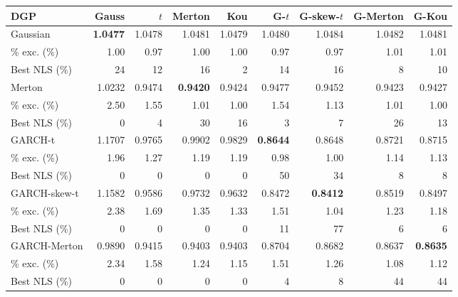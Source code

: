 \begin{tabular}{lrrrrrrrr}
\toprule
DGP & Gauss & $t$ & Merton & Kou & G-$t$ & G-skew-$t$ & G-Merton & G-Kou \\
\midrule
Gaussian & \textbf{1.0477} & 1.0478 & 1.0481 & 1.0479 & 1.0480 & 1.0484 & 1.0482 & 1.0481 \\
\quad 99\% exc. (\%) & 1.00 & 0.97 & 1.00 & 1.00 & 0.97 & 0.97 & 1.01 & 1.01 \\
\quad Best NLS (\%) & 24 & 12 & 16 & 2 & 14 & 16 & 8 & 10 \\
\midrule
Merton & 1.0232 & 0.9474 & \textbf{0.9420} & 0.9424 & 0.9477 & 0.9452 & 0.9423 & 0.9427 \\
\quad 99\% exc. (\%) & 2.50 & 1.55 & 1.01 & 1.00 & 1.54 & 1.13 & 1.01 & 1.00 \\
\quad Best NLS (\%) & 0 & 4 & 30 & 16 & 3 & 7 & 26 & 13 \\
\midrule
GARCH-t & 1.1707 & 0.9765 & 0.9902 & 0.9829 & \textbf{0.8644} & 0.8648 & 0.8721 & 0.8715 \\
\quad 99\% exc. (\%) & 1.96 & 1.27 & 1.19 & 1.19 & 0.98 & 1.00 & 1.14 & 1.13 \\
\quad Best NLS (\%) & 0 & 0 & 0 & 0 & 50 & 34 & 8 & 8 \\
\midrule
GARCH-skew-t & 1.1582 & 0.9586 & 0.9732 & 0.9632 & 0.8472 & \textbf{0.8412} & 0.8519 & 0.8497 \\
\quad 99\% exc. (\%) & 2.38 & 1.69 & 1.35 & 1.33 & 1.51 & 1.04 & 1.23 & 1.18 \\
\quad Best NLS (\%) & 0 & 0 & 0 & 0 & 11 & 77 & 6 & 6 \\
\midrule
GARCH-Merton & 0.9890 & 0.9415 & 0.9403 & 0.9403 & 0.8704 & 0.8682 & 0.8637 & \textbf{0.8635} \\
\quad 99\% exc. (\%) & 2.34 & 1.58 & 1.24 & 1.15 & 1.51 & 1.26 & 1.08 & 1.12 \\
\quad Best NLS (\%) & 0 & 0 & 0 & 0 & 4 & 8 & 44 & 44 \\
\bottomrule
\end{tabular}
